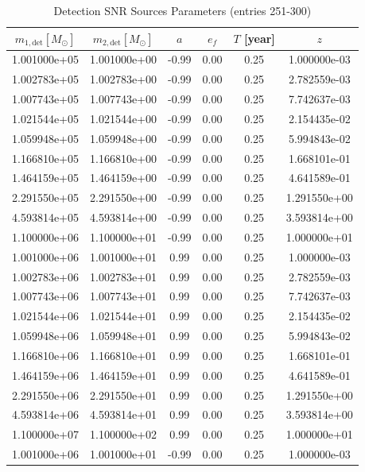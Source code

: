 \documentclass{article}
\begin{document}
\clearpage

\begin{table}[htbp]
\centering
\caption{Detection SNR Sources Parameters (entries 251-300)}
\label{tab:snr_sources_6}
\begin{tabular}{cccccc}
\hline
$m_{1,\mathrm{det}} [M_\odot]$ & $m_{2,\mathrm{det}} [M_\odot]$ & $a$ & $e_f$ & $T$ [year] & $z$ \\
\hline
1.001000e+05 & 1.001000e+00 & -0.99 & 0.00 & 0.25 & 1.000000e-03 \\
1.002783e+05 & 1.002783e+00 & -0.99 & 0.00 & 0.25 & 2.782559e-03 \\
1.007743e+05 & 1.007743e+00 & -0.99 & 0.00 & 0.25 & 7.742637e-03 \\
1.021544e+05 & 1.021544e+00 & -0.99 & 0.00 & 0.25 & 2.154435e-02 \\
1.059948e+05 & 1.059948e+00 & -0.99 & 0.00 & 0.25 & 5.994843e-02 \\
1.166810e+05 & 1.166810e+00 & -0.99 & 0.00 & 0.25 & 1.668101e-01 \\
1.464159e+05 & 1.464159e+00 & -0.99 & 0.00 & 0.25 & 4.641589e-01 \\
2.291550e+05 & 2.291550e+00 & -0.99 & 0.00 & 0.25 & 1.291550e+00 \\
4.593814e+05 & 4.593814e+00 & -0.99 & 0.00 & 0.25 & 3.593814e+00 \\
1.100000e+06 & 1.100000e+01 & -0.99 & 0.00 & 0.25 & 1.000000e+01 \\
1.001000e+06 & 1.001000e+01 & 0.99 & 0.00 & 0.25 & 1.000000e-03 \\
1.002783e+06 & 1.002783e+01 & 0.99 & 0.00 & 0.25 & 2.782559e-03 \\
1.007743e+06 & 1.007743e+01 & 0.99 & 0.00 & 0.25 & 7.742637e-03 \\
1.021544e+06 & 1.021544e+01 & 0.99 & 0.00 & 0.25 & 2.154435e-02 \\
1.059948e+06 & 1.059948e+01 & 0.99 & 0.00 & 0.25 & 5.994843e-02 \\
1.166810e+06 & 1.166810e+01 & 0.99 & 0.00 & 0.25 & 1.668101e-01 \\
1.464159e+06 & 1.464159e+01 & 0.99 & 0.00 & 0.25 & 4.641589e-01 \\
2.291550e+06 & 2.291550e+01 & 0.99 & 0.00 & 0.25 & 1.291550e+00 \\
4.593814e+06 & 4.593814e+01 & 0.99 & 0.00 & 0.25 & 3.593814e+00 \\
1.100000e+07 & 1.100000e+02 & 0.99 & 0.00 & 0.25 & 1.000000e+01 \\
1.001000e+06 & 1.001000e+01 & -0.99 & 0.00 & 0.25 & 1.000000e-03 \\

\end{tabular}
\end{table}
\end{document}
